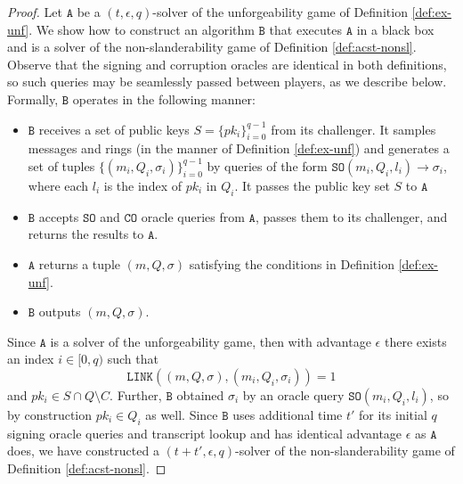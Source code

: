 \documentclass{llncs}
\newcommand{\A}{\texttt{A}}
\newcommand{\B}{\texttt{B}}
\begin{document}
\begin{proof}
    Let $\A$ be a $(t,\epsilon,q)$-solver of the unforgeability game of Definition \ref{def:ex-unf}. We show how to construct an algorithm $\B$ that executes $\A$ in a black box and is a solver of the non-slanderability game of Definition \ref{def:acst-nonsl}. Observe that the signing and corruption oracles are identical in both definitions, so such queries may be seamlessly passed between players, as we describe below. Formally, $\B$ operates in the following manner:
    \begin{itemize}
        \item $\B$ receives a set of public keys $S = \{pk_i\}_{i=0}^{q-1}$ from its challenger. It samples messages and rings (in the manner of Definition \ref{def:ex-unf}) and generates a set of tuples $\{(m_i,Q_i,\sigma_i)\}_{i=0}^{q-1}$ by queries of the form $\texttt{SO}(m_i,Q_i,l_i) \to \sigma_i$, where each $l_i$ is the index of $pk_i$ in $Q_i$. It passes the public key set $S$ to $\A$
        \item $\B$ accepts $\texttt{SO}$ and $\texttt{CO}$ oracle queries from $\A$, passes them to its challenger, and returns the results to $\A$.
        \item $\A$ returns a tuple $(m,Q,\sigma)$ satisfying the conditions in Definition \ref{def:ex-unf}.
        \item $\B$ outputs $(m,Q,\sigma)$.
    \end{itemize}
    Since $\A$ is a solver of the unforgeability game, then with advantage $\epsilon$ there exists an index $i \in [0,q)$ such that $$\texttt{LINK}((m,Q,\sigma),(m_i,Q_i,\sigma_i)) = 1$$ and $pk_i \in S \cap Q \setminus C$. Further, $\B$ obtained $\sigma_i$ by an oracle query $\texttt{SO}(m_i,Q_i,l_i)$, so by construction $pk_i \in Q_i$ as well. Since $\B$ uses additional time $t'$ for its initial $q$ signing oracle queries and transcript lookup and has identical advantage $\epsilon$ as $\A$ does, we have constructed a $(t+t',\epsilon,q)$-solver of the non-slanderability game of Definition \ref{def:acst-nonsl}.


\end{proof}
\end{document}
